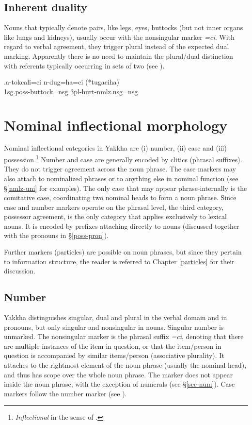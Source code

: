 \subsection{Inherent duality}\label{lex-noun-5}

Nouns that typically denote pairs, like legs, eyes, buttocks (but not inner organs like lungs and kidneys), usually occur with the nonsingular marker \emph{=ci}. With regard to verbal agreement, they trigger plural instead of the expected dual marking. Apparently there is no need to maintain the plural/dual distinction with referents typically occurring in sets of two (see \Next). 

\exg.a-tokcali=ci n-dug=ha=ci (*tugaciha)\\
{\sc 1sg.poss-}buttock{\sc =nsg} {\sc 3pl-}hurt{\sc -nmlz.nsg=nsg}\\
 
\section{Nominal  inflectional morphology}\label{nom-morph}

Nominal inflectional categories in Yakkha are (i) number, (ii) case and (iii) possession.\footnote{\emph{Inflectional} in the sense of  \citep{Bickeletal2007Inflectional}.} Number and case are generally encoded by clitics (phrasal suffixes). They do not trigger agreement across the noun phrase. The case markers may also attach to nominalized phrases or to anything else in nominal function (see §\ref{nmlz-uni} for examples). The only case that may appear phrase-internally is the comitative case, coordinating two nominal heads to form a noun phrase. Since case and number markers operate on the phrasal level, the third category, possessor agreement, is the only category that applies exclusively to lexical nouns. It is encoded by prefixes attaching directly to nouns (discussed together with the pronouns in §\ref{poss-pron}). 

Further markers (particles) are  possible on noun phrases, but since they pertain to information structure, the reader is referred to Chapter \ref{particles} for their discussion.

\subsection{Number}\label{number}

Yakkha distinguishes singular, dual and plural in the verbal domain and in pronouns, but only singular and nonsingular in nouns. Singular number is unmarked. The nonsingular marker is the phrasal suffix \emph{=ci}, denoting that there are multiple instances of the item in question, or that the item/person in question is accompanied by similar items/person (associative plurality). It attaches to the rightmost element of the noun phrase (usually the nominal head), and thus has scope over the whole noun phrase. The marker does not appear inside the noun phrase, with the exception of numerals (see §\ref{sec-num}). Case markers follow the number marker (see \Next). 

